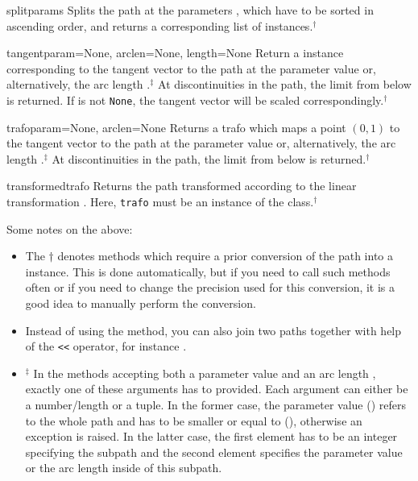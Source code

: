 \begin{methoddesc}{split}{params}
  Splits the path at the parameters , which have to be
  sorted in ascending order, and returns a corresponding list of
   instances.$^\dagger$
\end{methoddesc}

\begin{methoddesc}{tangent}{param=None, arclen=None, length=None}
  Return a  instance corresponding to the tangent vector
  to the path at the parameter value  or, alternatively,
  the arc length .$^\ddagger$ At discontinuities in the
  path, the limit from below is returned. If  is not
  \texttt{None}, the tangent vector will be scaled
  correspondingly.$^\dagger$
\end{methoddesc}


\begin{methoddesc}{trafo}{param=None, arclen=None}
  Returns a trafo which maps a point $(0, 1)$ to the tangent vector to
  the path at the parameter value  or, alternatively, the
  arc length .$^\ddagger$ At discontinuities in the path,
  the limit from below is returned.$^\dagger$
\end{methoddesc}

\begin{methoddesc}{transformed}{trafo}
  Returns the path transformed according to the linear transformation
  . Here, \texttt{trafo} must be an instance of the
   class.$^\dagger$
\end{methoddesc}

Some notes on the above:
\begin{itemize}
\item The $\dagger$ denotes methods which require a prior
  conversion of the path into a  instance. This is
  done automatically, but if you need to call such methods often or
  if you need to change the precision used for this conversion, 
  it is a good idea to manually perform the conversion.
\item Instead of using the  method, you can also join two
paths together with help of the \verb|<<| operator, for instance
.
\item $^\ddagger$ In the methods accepting both a parameter value
   and an arc length , exactly one of these
  arguments has to provided.  Each argument can either be a
  number/length or a tuple.  In the former case, the parameter value
   () refers to the whole path and has to be
  smaller or equal to  (),
  otherwise an exception is raised.  In the latter case, the first
  element has to be an integer specifying the subpath and the second
  element specifies the parameter value or the arc length inside of
  this subpath.
\end{itemize}

